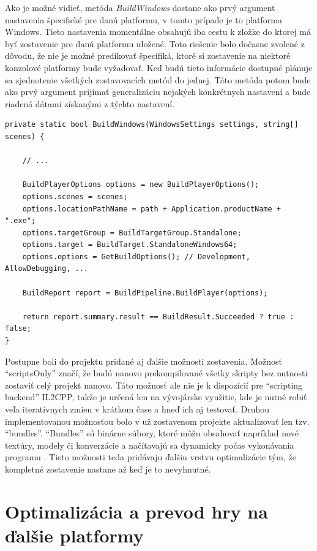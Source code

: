 \documentclass[slovak, bachelorpractice]{diploma}
\begin{document}
Ako je možné vidieť, metóda \textit{BuildWindows} dostane ako prvý argument nastavenia špecifické pre danú platformu, v tomto prípade je to platforma Windows. Tieto nastavenia momentálne obsahujú iba cestu k zložke do ktorej má byť zostavenie pre danú platformu uložené. Toto riešenie bolo dočasne zvolené z dôvodu, že nie je možné predikovať špecifiká, ktoré si zostavenie na niektoré konzolové platformy bude vyžadovať. Keď budú tieto informácie dostupné plánuje sa zjednotenie všetkých zostavovacích metód do jednej. Táto metóda potom bude ako prvý argument prijímať generalizáciu nejakých konkrétnych nastavení a bude riadená dátami získanými z týchto nastavení.

\vspace{10pt}
\begin{lstlisting}[label=src:bwin,caption={Nastavenie a spustenie programového zostavenia hry pre OS Windows}]
private static bool BuildWindows(WindowsSettings settings, string[] scenes) {

	// ...
	
    BuildPlayerOptions options = new BuildPlayerOptions();
    options.scenes = scenes;
    options.locationPathName = path + Application.productName + ".exe";
    options.targetGroup = BuildTargetGroup.Standalone;
    options.target = BuildTarget.StandaloneWindows64;
    options.options = GetBuildOptions(); // Development, AllowDebugging, ...

    BuildReport report = BuildPipeline.BuildPlayer(options);
    
    return report.summary.result == BuildResult.Succeeded ? true : false;
}
\end{lstlisting}

Postupne boli do projektu pridané aj ďalšie možnosti zostavenia. Možnosť \enquote{scriptsOnly} značí, že budú nanovo prekompilované všetky skripty bez nutnosti zostaviť celý projekt nanovo. Táto možnosť ale nie je k dispozícií pre \enquote{scripting backend} IL2CPP, takže je určená len na vývojárske využitie, kde je nutné robiť veľa iteratívnych zmien v krátkom čase a hneď ich aj testovať. Druhou implementovanou možnosťou bolo v už zostavenom projekte aktualizovať len tzv. \enquote{bundles}. \enquote{Bundles} sú binárne súbory, ktoré môžu obsahovať napríklad nové textúry, modely či konverzácie a načítavajú sa dynamicky počas vykonávania programu \cite{Bundles}. Tieto možnosti teda pridávaju ďalšiu vrstvu optimalizácie tým, že kompletné zostavenie nastane až keď je to nevyhnutné.

\section{Optimalizácia a prevod hry na ďalšie platformy}
\label{sec:Port}
\end{document}
